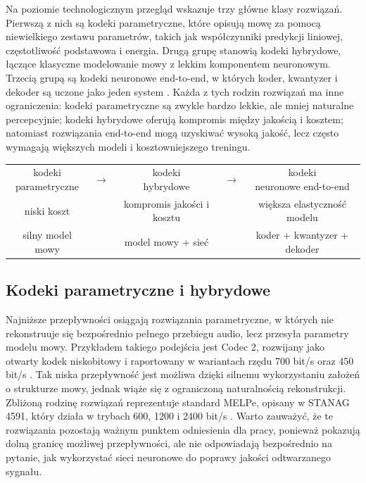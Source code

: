 Na poziomie technologicznym przegląd wskazuje trzy główne klasy rozwiązań. Pierwszą z nich są kodeki parametryczne, które opisują mowę za pomocą niewielkiego zestawu parametrów, takich jak współczynniki predykcji liniowej, częstotliwość podstawowa i energia. Drugą grupę stanowią kodeki hybrydowe, łączące klasyczne modelowanie mowy z lekkim komponentem neuronowym. Trzecią grupą są kodeki neuronowe end-to-end, w których koder, kwantyzer i dekoder są uczone jako jeden system \cite{Rowe2019Codec2,Valin2019LPCNet,Zeghidour2021SoundStream,Defossez2022Encodec}. Każda z tych rodzin rozwiązań ma inne ograniczenia: kodeki parametryczne są zwykle bardzo lekkie, ale mniej naturalne percepcyjnie; kodeki hybrydowe oferują kompromis między jakością i kosztem; natomiast rozwiązania end-to-end mogą uzyskiwać wysoką jakość, lecz często wymagają większych modeli i kosztowniejszego treningu.

\begin{center}
\centering
\footnotesize
\setlength{\tabcolsep}{3pt}
\begin{tabular}{c c c c c}
\fbox{\parbox{0.19\textwidth}{\centering kodeki\\parametryczne}} &
\(\rightarrow\) &
\fbox{\parbox{0.19\textwidth}{\centering kodeki\\hybrydowe}} &
\(\rightarrow\) &
\fbox{\parbox{0.19\textwidth}{\centering kodeki\\neuronowe end-to-end}} \\
niski koszt & & kompromis jakości i kosztu & & większa elastyczność modelu \\
silny model mowy & & model mowy + sieć & & koder + kwantyzer + dekoder \\
\end{tabular}
\label{fig:rodziny-kodekow}
\end{center}

\subsection{Kodeki parametryczne i hybrydowe}
\label{subsec:kodeki-parametryczne-hybrydowe}

Najniższe przepływności osiągają rozwiązania parametryczne, w których nie rekonstruuje się bezpośrednio pełnego przebiegu audio, lecz przesyła parametry modelu mowy. Przykładem takiego podejścia jest Codec 2, rozwijany jako otwarty kodek niskobitowy i raportowany w wariantach rzędu 700 bit/s oraz 450 bit/s \cite{Rowe2019Codec2,Rowe2021Codec2450}. Tak niska przepływność jest możliwa dzięki silnemu wykorzystaniu założeń o strukturze mowy, jednak wiąże się z ograniczoną naturalnością rekonstrukcji. Zbliżoną rodzinę rozwiązań reprezentuje standard MELPe, opisany w STANAG 4591, który działa w trybach 600, 1200 i 2400 bit/s \cite{NATO2015STANAG4591}. Warto zauważyć, że te rozwiązania pozostają ważnym punktem odniesienia dla pracy, ponieważ pokazują dolną granicę możliwej przepływności, ale nie odpowiadają bezpośrednio na pytanie, jak wykorzystać sieci neuronowe do poprawy jakości odtwarzanego sygnału.

